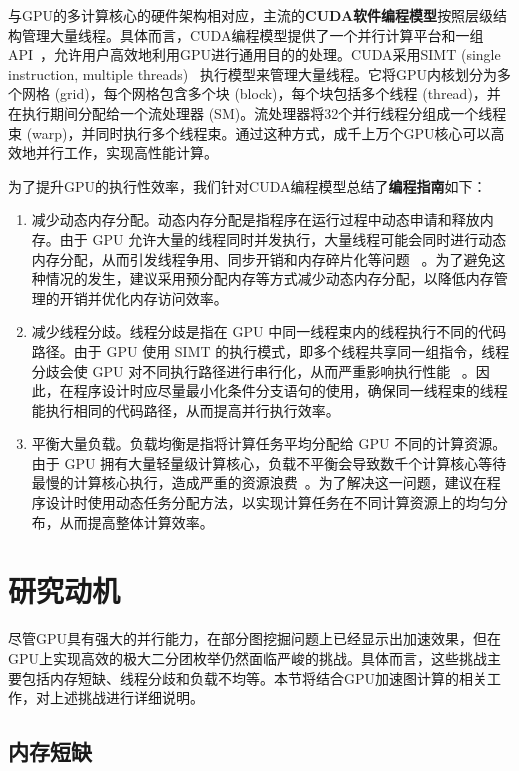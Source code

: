 与GPU的多计算核心的硬件架构相对应，主流的\textbf{CUDA软件编程模型}按照层级结构管理大量线程。具体而言，CUDA编程模型提供了一个并行计算平台和一组API~\cite{CUDA-wiki,CUDAProgrammingGuide}，允许用户高效地利用GPU进行通用目的的处理。CUDA采用SIMT (single instruction, multiple threads)~\cite{SIMT-wiki} 执行模型来管理大量线程。它将GPU内核划分为多个网格 (grid)，每个网格包含多个块 (block)，每个块包括多个线程 (thread)，并在执行期间分配给一个流处理器 (SM)。流处理器将32个并行线程分组成一个线程束 (warp)，并同时执行多个线程束。通过这种方式，成千上万个GPU核心可以高效地并行工作，实现高性能计算。

为了提升GPU的执行性效率，我们针对CUDA编程模型总结了\textbf{编程指南}如下：

\begin{enumerate}
  \item 减少动态内存分配。动态内存分配是指程序在运行过程中动态申请和释放内存。由于 GPU 允许大量的线程同时并发执行，大量线程可能会同时进行动态内存分配，从而引发线程争用、同步开销和内存碎片化等问题 ~\cite{DynamicMallocGpu21}。为了避免这种情况的发生，建议采用预分配内存等方式减少动态内存分配，以降低内存管理的开销并优化内存访问效率。
  
  \item 减少线程分歧。线程分歧是指在 GPU 中同一线程束内的线程执行不同的代码路径。由于 GPU 使用 SIMT 的执行模式，即多个线程共享同一组指令，线程分歧会使 GPU 对不同执行路径进行串行化，从而严重影响执行性能 ~\cite{CUDAProgrammingGuide}。因此，在程序设计时应尽量最小化条件分支语句的使用，确保同一线程束的线程能执行相同的代码路径，从而提高并行执行效率。

  \item 平衡大量负载。负载均衡是指将计算任务平均分配给 GPU 不同的计算资源。由于 GPU 拥有大量轻量级计算核心，负载不平衡会导致数千个计算核心等待最慢的计算核心执行，造成严重的资源浪费~\cite{CUDAProgrammingGuide}。为了解决这一问题，建议在程序设计时使用动态任务分配方法，以实现计算任务在不同计算资源上的均匀分布，从而提高整体计算效率。
\end{enumerate}


\section{研究动机}

尽管GPU具有强大的并行能力，在部分图挖掘问题上已经显示出加速效果，但在GPU上实现高效的极大二分团枚举仍然面临严峻的挑战。具体而言，这些挑战主要包括内存短缺、线程分歧和负载不均等。本节将结合GPU加速图计算的相关工作，对上述挑战进行详细说明。
\subsection{内存短缺}

